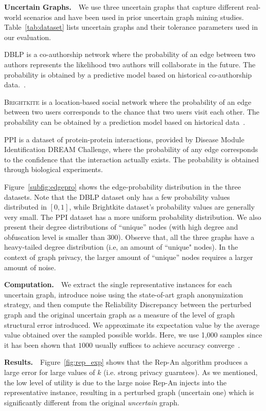 \textbf{Uncertain Graphs.}~~We use three uncertain graphs that capture different real-world scenarios and have been used in prior uncertain graph mining studies. Table~\ref{tab:dataset} lists uncertain graphs and their tolerance parameters used in our evaluation.

\textsc{DBLP} is a co-authorship network where the probability of an edge between two authors represents the likelihood two authors will collaborate in the future. The probability is obtained by a predictive model based on historical co-authorship data.~\cite{Jin_Distance_2011}. 

\textsc{Brightkite} is a location-based social network where the probability of an edge between two users corresponds to the chance that two users visit each other. The probability can be obtained by a prediction model based on historical data~\cite{Cho_Friendship_2011}.

\textsc{PPI} is a dataset of protein-protein interactions, provided by Disease Module Identification DREAM Challenge, where the probability of any edge corresponds to the confidence that the interaction actually exists.
The probability is obtained through biological experiments.

Figure~\ref{subfig:edgepro} shows the edge-probability distribution in the three datasets. 
Note that the DBLP dataset only has a few probability values distributed in $[0,1]$, while Brightkite dataset's probability values are generally very small. The PPI dataset has a more uniform probability distribution. 
We also present their degree distributions of ``unique'' nodes (with high degree and obfuscation level is smaller than $300$). Observe that, all the three graphs have a heavy-tailed degree distribution (i.e, an amount of ``unique" nodes). In the context of graph privacy, the larger amount of ``unique'' nodes requires a larger amount of noise.


\textbf{Computation.}~~We extract the single representative instances for each uncertain graph, introduce noise using the state-of-art graph anonymization strategy, and then compute the Reliability Discrepancy between the perturbed graph and the original uncertain graph as a measure of the level of graph structural error introduced. We approximate its expectation value by the average value obtained over the sampled possible worlds. Here, we use 1,000 samples since it has been shown that $1000$ usually suffices to achieve accuracy converge~\cite{Potamias_K_2010}.

\textbf{Results.}~~Figure~\ref{fig:rep_exp} shows that the Rep-An algorithm produces a large error for large values of $k$ (i.e. strong privacy guarntees). As we mentioned, the low level of utility is due to the large noise Rep-An injects into the representative instance, resulting in a perturbed graph (uncertain one) which is significantly different from the original \emph{uncertain} graph. 

